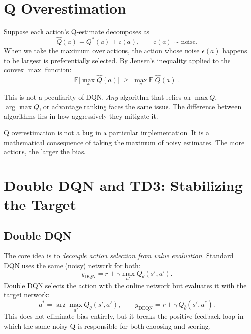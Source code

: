 \section{Q Overestimation}
\label{sec:overestimation}

Suppose each action's Q-estimate decomposes as
\begin{equation}
  \hat{Q}(a) = Q^*(a) + \epsilon(a),
  \qquad \epsilon(a) \sim \text{noise}.
\end{equation}
When we take the maximum over actions, the action whose noise $\epsilon(a)$ happens to be largest is preferentially selected. By Jensen's inequality applied to the convex $\max$ function:
\begin{equation}
  \mathbb{E}\!\bigl[\max_a \hat{Q}(a)\bigr]
  \;\ge\;
  \max_a \mathbb{E}\!\bigl[\hat{Q}(a)\bigr].
  \label{eq:overestimation}
\end{equation}

This is not a peculiarity of DQN. \emph{Any} algorithm that relies on $\max Q$, $\arg\max Q$, or advantage ranking faces the same issue. The difference between algorithms lies in how aggressively they mitigate it.

\begin{keyidea}
Q overestimation is not a bug in a particular implementation. It is a mathematical consequence of taking the maximum of noisy estimates. The more actions, the larger the bias.
\end{keyidea}

\section{Double DQN and TD3: Stabilizing the Target}
\label{sec:double-td3}

\subsection{Double DQN}

The core idea is to \emph{decouple action selection from value evaluation}. Standard DQN uses the same (noisy) network for both:
\begin{equation}
  y_{\text{DQN}} = r + \gamma \max_{a'} Q_{\bar\theta}(s', a').
\end{equation}
Double DQN selects the action with the online network but evaluates it with the target network:
\begin{equation}
  a^* = \arg\max_{a'} Q_\theta(s', a'),
  \qquad
  y_{\text{DDQN}} = r + \gamma\, Q_{\bar\theta}(s', a^*).
  \label{eq:double-dqn}
\end{equation}
This does not eliminate bias entirely, but it breaks the positive feedback loop in which the same noisy Q is responsible for both choosing and scoring.

